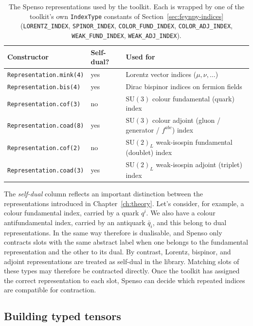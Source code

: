 \begin{table}[htbp]
\centering
\begin{tabular}{@{}llp{6.6cm}@{}}
\toprule
\textbf{Constructor} & \textbf{Self-dual?} & \textbf{Used for} \\
\midrule
\texttt{Representation.mink(4)}  & yes & Lorentz vector indices ($\mu,\nu,\dots$) \\
\texttt{Representation.bis(4)}   & yes & Dirac bispinor indices on fermion fields \\
\texttt{Representation.cof(3)}   & no  & $\mathrm{SU}(3)$ colour fundamental (quark) index \\
\texttt{Representation.coad(8)}  & yes & $\mathrm{SU}(3)$ colour adjoint (gluon / generator / $f^{abc}$) index \\
\texttt{Representation.cof(2)}   & no  & $\mathrm{SU}(2)_L$ weak-isospin fundamental (doublet) index \\
\texttt{Representation.coad(3)}  & yes & $\mathrm{SU}(2)_L$ weak-isospin adjoint (triplet) index \\
\bottomrule
\end{tabular}
\caption{The Spenso representations used by the toolkit. Each is wrapped by one of the toolkit's own \texttt{IndexType} constants of Section~\ref{sec:feynpy-indices} (\texttt{LORENTZ\_INDEX}, \texttt{SPINOR\_INDEX}, \texttt{COLOR\_FUND\_INDEX}, \texttt{COLOR\_ADJ\_INDEX}, \texttt{WEAK\_FUND\_INDEX}, \texttt{WEAK\_ADJ\_INDEX}).}
\label{tab:spenso-representations}
\end{table}

The \emph{self-dual} column reflects an important distinction between the representations introduced in Chapter~\ref{ch:theory}. Let's consider, for example, a colour fundamental index, carried by a quark $q^i$. We also have a colour antifundamental index, carried by an antiquark $\bar q_i$, and this belong to dual representations. In the same way therefore  is dualisable, and Spenso only contracts slots with the same abstract label when one belongs to the fundamental representation and the other to its dual. By contrast, Lorentz, bispinor, and adjoint representations are treated as self-dual in the library. Matching slots of these types may therefore be contracted directly. Once the toolkit has assigned the correct representation to each slot, Spenso can decide which repeated indices are compatible for contraction.

\subsection*{Building typed tensors}

